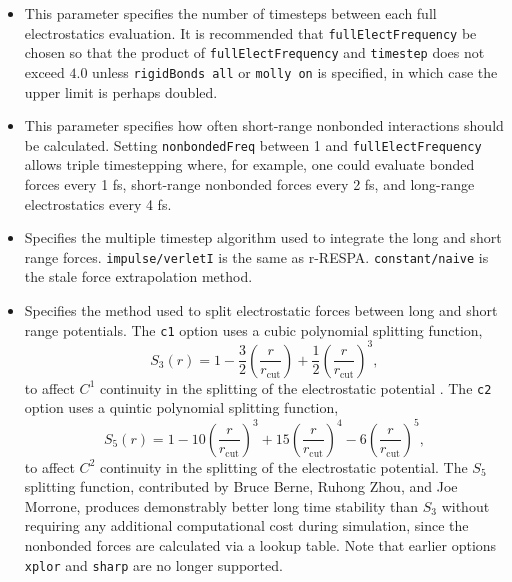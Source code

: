 \begin{itemize}

\item
{}
{This parameter specifies the number of timesteps between each full electrostatics evaluation.
It is recommended that {\tt fullElectFrequency} be chosen so that 
the product of {\tt fullElectFrequency} and {\tt timestep} does 
not exceed $4.0$ unless {\tt rigidBonds all} or {\tt molly on} is specified, 
in which case the upper limit is perhaps doubled.}

\item
{}
{This parameter specifies how often short-range nonbonded interactions should be calculated.  Setting {\tt nonbondedFreq} between 1 and {\tt fullElectFrequency} allows triple timestepping where, for example, one could evaluate bonded forces every 1 fs, short-range nonbonded forces every 2 fs, and long-range electrostatics every 4 fs.} 

\item
{}
{Specifies the multiple timestep algorithm used to integrate the 
long and short range forces.  {\tt impulse/verletI} is the same as r-RESPA.
{\tt constant/naive} is the stale force extrapolation method.}

\item
{}
{Specifies the method used to split electrostatic forces between long 
and short range potentials.  
The {\tt c1} option uses a cubic polynomial splitting function,
$$S_3(r) = 1 - \frac{3}{2}\left(\frac{r}{r_{\text{cut}}}\right)
+ \frac{1}{2}\left(\frac{r}{r_{\text{cut}}}\right)^3,$$
to affect $C^1$ continuity in the splitting of the electrostatic potential
.
The {\tt c2} option uses a quintic polynomial splitting function,
$$S_5(r) = 1 - 10\left(\frac{r}{r_{\text{cut}}}\right)^3
+ 15\left(\frac{r}{r_{\text{cut}}}\right)^4
- 6\left(\frac{r}{r_{\text{cut}}}\right)^5,$$
to affect $C^2$ continuity in the splitting of the electrostatic potential.
The $S_5$ splitting function,
contributed by Bruce Berne, Ruhong Zhou, and Joe Morrone,
produces demonstrably better long time stability than $S_3$
without requiring any additional
computational cost during simulation,
since the nonbonded forces are calculated via a lookup table.
Note that earlier options
{\tt xplor} and {\tt sharp} are no longer supported.
}


\end{itemize}
